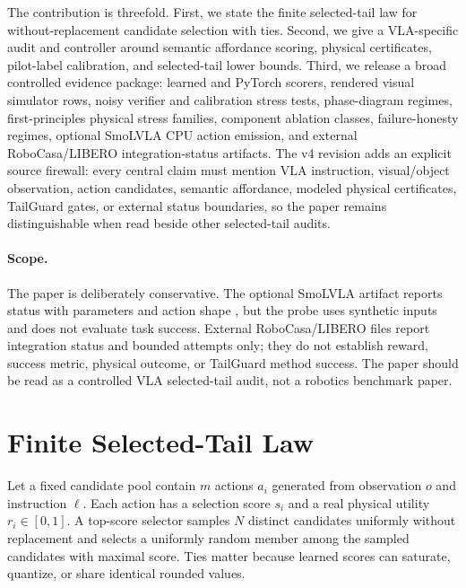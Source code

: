 \documentclass{article}
\begin{document}
The contribution is threefold. First, we state the finite selected-tail law for without-replacement candidate selection with ties. Second, we give a VLA-specific audit and controller around semantic affordance scoring, physical certificates, pilot-label calibration, and selected-tail lower bounds. Third, we release a broad controlled evidence package: learned and PyTorch scorers, rendered visual simulator rows, noisy verifier and calibration stress tests, \VThreePhaseRows{} phase-diagram regimes, \VThreePhysicsStressFamilies{} first-principles physical stress families, \VThreeAblationComponents{} component ablation classes, failure-honesty regimes, optional SmoLVLA CPU action emission, and external RoboCasa/LIBERO integration-status artifacts. The v4 revision adds an explicit source firewall: every central claim must mention VLA instruction, visual/object observation, action candidates, semantic affordance, modeled physical certificates, TailGuard gates, or external status boundaries, so the paper remains distinguishable when read beside other selected-tail audits.

\paragraph{Scope.}
The paper is deliberately conservative. The optional SmoLVLA artifact reports status \texttt{\VThreeProbeStatus{}} with \VThreeProbeParams{} parameters and action shape \VThreeProbeActionShape{}, but the probe uses synthetic inputs and does not evaluate task success. External RoboCasa/LIBERO files report integration status and bounded attempts only; they do not establish reward, success metric, physical outcome, or TailGuard method success. The paper should be read as a controlled VLA selected-tail audit, not a robotics benchmark paper.

\section{Finite Selected-Tail Law}

Let a fixed candidate pool contain $m$ actions $a_i$ generated from observation $o$ and instruction $\ell$. Each action has a selection score $s_i$ and a real physical utility $r_i\in[0,1]$. A top-score selector samples $N$ distinct candidates uniformly without replacement and selects a uniformly random member among the sampled candidates with maximal score. Ties matter because learned scores can saturate, quantize, or share identical rounded values.
\end{document}
